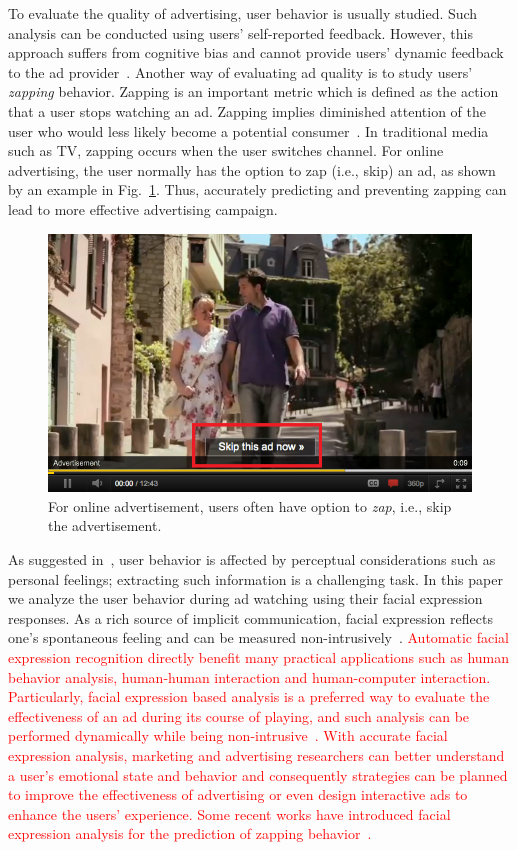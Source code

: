 \documentclass[twoside,leqno,twocolumn]{article}
\newcommand{\Songfan}[1]{\textcolor{red}{#1}}
\begin{document}
To evaluate the quality of advertising, user behavior is usually studied. Such analysis can be conducted using users' self-reported feedback. However, this approach suffers from cognitive bias and cannot provide users' dynamic feedback to the ad provider~\cite{Poels06}. Another way of evaluating ad quality is to study users' \textit{zapping} behavior. Zapping is an important metric which is defined as the action that a user stops watching an ad. Zapping implies diminished attention of the user who would less likely become a potential consumer~\cite{Elpers03}. In traditional media such as TV, zapping occurs when the user switches channel. For online advertising, the user normally has the option to zap (i.e., skip) an ad, as shown by an example in Fig.~\ref{fig:zap_example}. Thus, accurately predicting and preventing zapping can lead to more effective advertising campaign. 

\begin{figure}[t] 
\centering
\includegraphics[width=0.8\columnwidth]{fig/eg_ad}
\caption{For online advertisement, users often have option to \textit{zap}, i.e., skip the advertisement.}
\label{fig:zap_example}
\end{figure}

As suggested in~\cite{Abbasi_15}, user behavior is affected by perceptual considerations such as personal feelings; extracting such information is a challenging task. In this paper we analyze the user behavior during ad watching using their facial expression responses. As a rich source of implicit communication, facial expression reflects one's spontaneous feeling and can be measured non-intrusively~\cite{Ekman93}. \Songfan{Automatic facial expression recognition directly benefit many practical applications such as human behavior analysis, human-human interaction and human-computer interaction. Particularly, facial expression based analysis is a preferred way to evaluate the effectiveness of an ad during its course of playing, and such analysis can be performed dynamically while being non-intrusive~\cite{Teixeira12}. With accurate facial expression analysis, marketing and advertising researchers can better understand a user's emotional state and behavior and consequently strategies can be planned to improve the effectiveness of advertising or even design interactive ads to enhance the users' experience. Some recent works have introduced facial expression analysis for the prediction of zapping behavior~\cite{Yang_TAC14, Yang_FG15}.} 
\end{document}
